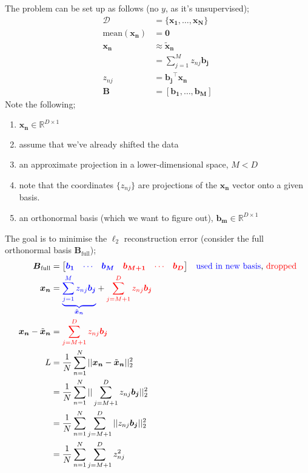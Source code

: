 \documentclass[a4paper, 12pt]{article}
\newcommand{\summation}[2]{\sum\limits_{#1}^{#2}}
\newcommand{\mat}[1]{\boldsymbol{#1}}
\renewcommand{\vec}[1]{\boldsymbol{#1}}
\newcommand{\mbbr}[0]{\mathbb{R}}
\newcommand{\blue}[1]{\textcolor{blue}{#1}}
\newcommand{\red}[1]{\textcolor{red}{#1}}
\begin{document}
                The problem can be set up as follows (no $y$, as it's unsupervised);
                \setcounter{equation}{0}
                \begin{align}
                    \mathcal{D} & = \{ \mat{x_1}, \dots, \mat{x_N} \} \\
                    \mathrm{mean}(\mat{x_n}) & = \mat{0} \\
                    \mat{x_n} & \approx \tilde{\mat{x}}_{\mat{n}} \\
                    & = \summation{j = 1}{M} z_{nj} \mat{b_j} \\
                    z_{nj} & = \mat{b_j}^\top \mat{x_n} \\
                    \mat{B} & = [\mat{b_1}, \dots, \mat{b_M}]
                \end{align}
                Note the following;
                \begin{enumerate}[(1)]
                    \itemsep0em
                    \item $\mat{x_n} \in \mbbr^{D \times 1}$
                    \item assume that we've already shifted the data
                    \item an approximate projection in a lower-dimensional space, $M < D$
                    \setcounter{enumi}{4}
                    \item note that the coordinates $\{z_{nj}\}$ are projections of the $\mat{x_n}$ vector onto a given basis.
                    \item an orthonormal basis (which we want to figure out), $\mat{b_m} \in \mbbr^{D \times 1}$
                \end{enumerate}
                The goal is to minimise the $\ell_2$ reconstruction error (consider the full orthonormal basis $\mat{B}_\text{full}$);
                \begin{align*}
                    \mat{B}_\text{full} & = \begin{bmatrix}
                        \blue{\vec{b_1}} & \blue{\cdots} & \blue{\vec{b_M}} & \red{\vec{b_{M + 1}}} & \red{\cdots} & \red{\vec{b_{D}}}
                    \end{bmatrix} & \text{\blue{used in new basis}, \red{dropped}} \\
                    \vec{x_n} & = \blue{\underbrace{\summation{j = 1}{M} z_{nj}\mat{b_j}}_{\tilde{\mat{x}}_{\mat{n}}}} + \red{\summation{j = M + 1}{D} z_{nj}\mat{b_j}} \\
                    \mat{x_n} - \tilde{\mat{x}}_{\mat{n}} & = \red{\summation{j = M + 1}{D} z_{nj}\mat{b_j}} \\
                    L & = \frac{1}{N} \summation{n = 1}{N} || \mat{x_n} - \tilde{\mat{x}}_{\mat{n}} ||_2^2 \\
                    & = \frac{1}{N} \summation{n = 1}{N} || \summation{j = M + 1}{D} z_{nj}\mat{b_j} ||_2^2 \\
                    & = \frac{1}{N} \summation{n = 1}{N} \summation{j = M + 1}{D} || z_{nj}\mat{b_j} ||_2^2 \\
                    & = \frac{1}{N} \summation{n = 1}{N} \summation{j = M + 1}{D} z_{nj}^2
                \end{align*}
\end{document}
